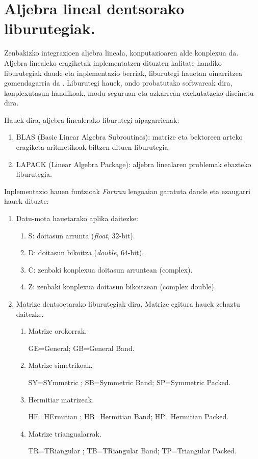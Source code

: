    
\section{Aljebra lineal dentsorako liburutegiak.}


Zenbakizko integrazioen aljebra lineala, konputazioaren alde konplexua da. Aljebra linealeko eragiketak inplementatzen dituzten kalitate handiko liburutegiak daude eta inplementazio berriak, liburutegi hauetan oinarritzea gomendagarria da \cite{Hogben2013}. Liburutegi hauek, ondo probatutako softwareak dira, konplexutasun handikoak, modu seguruan eta azkarrean exekutatzeko diseinatu dira.

Hauek dira, aljebra linealerako liburutegi aipagarrienak:
\begin{enumerate}
\item BLAS (Basic Linear Algebra Subroutines): matrize eta bektoreen arteko eragiketa aritmetikoak biltzen dituen liburutegia. 
\item LAPACK (Linear Algebra Package): aljebra linealaren problemak ebazteko liburutegia.
\end{enumerate}


Inplementazio hauen funtzioak \emph{Fortran} lengoaian garatuta daude eta ezaugarri hauek dituzte:
\begin{enumerate}
\item Datu-mota hauetarako aplika daitezke:
\begin{enumerate}
\item S: doitasun arrunta (\emph{float}, $32$-bit).
\item D: doitasun bikoitza (\emph{double}, $64$-bit).
\item C: zenbaki konplexua doitasun arruntean (complex).
\item Z: zenbaki konplexua doitasun bikoitzean (complex double).
\end{enumerate}  

\item Matrize dentsoetarako liburutegiak dira. Matrize egitura hauek zehaztu daitezke.
\begin{enumerate}
\item Matrize orokorrak.

 GE=General; GB=General Band.
\item Matrize simetrikoak.

 SY=SYmmetric ; SB=Symmetric Band; SP=Symmetric Packed.
\item Hermitiar matrizeak.

 HE=HErmitian ; HB=Hermitian Band; HP=Hermitian Packed.
\item Matrize triangualarrak.

 TR=TRiangular ; TB=TRiangular Band; TP=Triangular Packed.
\end{enumerate}

\end{enumerate}   

